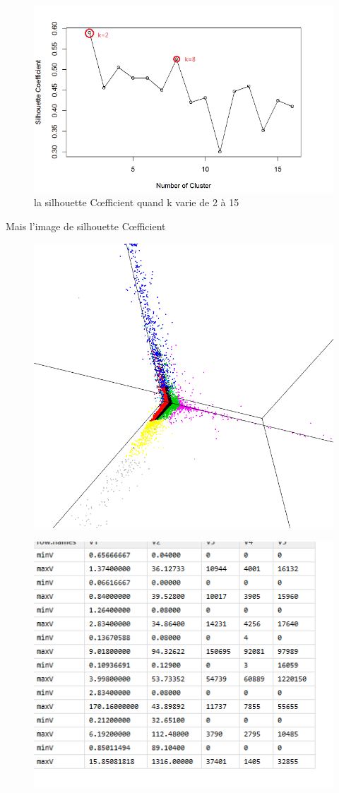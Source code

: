 \begin{figure}[H]
\centering
\includegraphics[width=0.9\linewidth]{images/sc}
\caption{la silhouette C\oe fficient quand k varie de 2 à 15}
\label{fig:sc}
\end{figure}
Mais l'image de silhouette C\oe fficient 

\begin{figure}[H]
\centering
\includegraphics[width=0.7\linewidth]{images/kmeqn}
\caption{}
\label{fig:kmeqn}
\end{figure}

\begin{figure}[H]
\centering
\includegraphics[width=0.7\linewidth]{images/max-min2}
\caption{}
\label{fig:max-min2}
\end{figure}

